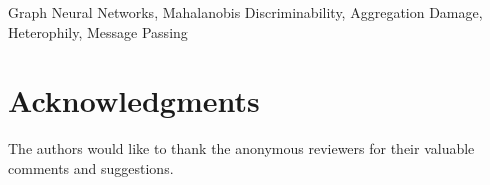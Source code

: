 \documentclass[lettersize,journal]{IEEEtran}
\begin{document}
\begin{IEEEkeywords}
Graph Neural Networks, Mahalanobis Discriminability, Aggregation Damage, Heterophily, Message Passing
\end{IEEEkeywords}












\section*{Acknowledgments}
The authors would like to thank the anonymous reviewers for their valuable comments and suggestions.





\vfill
\end{document}
